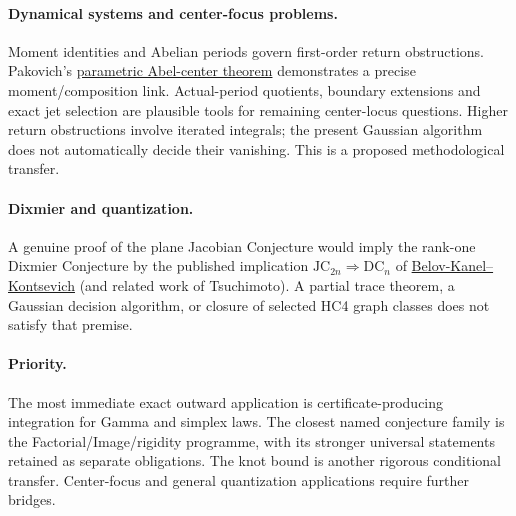 \documentclass[11pt]{article}
\begin{document}
\paragraph{Dynamical systems and center-focus problems.}
Moment identities and Abelian periods govern first-order return
obstructions. Pakovich's
\href{https://arxiv.org/abs/1407.0150}{parametric Abel-center theorem}
demonstrates a precise moment/composition link. Actual-period quotients,
boundary extensions and exact jet selection are plausible tools for
remaining center-locus questions. Higher return obstructions involve
iterated integrals; the present Gaussian algorithm does not automatically
decide their vanishing. This is a proposed methodological transfer.

\paragraph{Dixmier and quantization.}
A genuine proof of the plane Jacobian Conjecture would imply the rank-one
Dixmier Conjecture by the published implication
$\mathrm{JC}_{2n}\Rightarrow\mathrm{DC}_n$ of
\href{https://arxiv.org/abs/math/0512171}{Belov-Kanel--Kontsevich}
(and related work of Tsuchimoto).
A partial trace theorem, a Gaussian decision algorithm, or closure of
selected HC4 graph classes does not satisfy that premise.

\paragraph{Priority.}
The most immediate exact outward application is certificate-producing
integration for Gamma and simplex laws. The closest named conjecture
family is the Factorial/Image/rigidity programme, with its stronger
universal statements retained as separate obligations. The knot bound is
another rigorous conditional transfer. Center-focus and general
quantization applications require further bridges.
\end{document}
